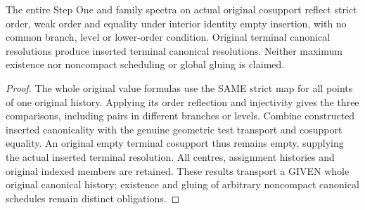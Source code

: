 \begin{corollary}
\label{hir:original-recursive-interior-spectrum-terminal-history}
\leanok
The entire Step One and family spectra on actual original cosupport reflect
strict order, weak order and equality under interior identity empty insertion,
with no common branch, level or lower-order condition. Original terminal
canonical resolutions produce inserted terminal canonical resolutions.
Neither maximum existence nor noncompact scheduling or global gluing is claimed.
\end{corollary}
\begin{proof}
The whole original value formulas use the SAME strict map for all points
of one original history. Applying its order reflection and injectivity gives
the three comparisons, including pairs in different branches or levels.
Combine constructed inserted canonicality with the genuine geometric test
transport and cosupport equality. An original empty terminal cosupport thus
remains empty, supplying the actual inserted terminal resolution. All centres,
assignment histories and original indexed members are retained. These results
transport a GIVEN whole original canonical history; existence and gluing of
arbitrary noncompact canonical schedules remain distinct obligations.
\end{proof}

